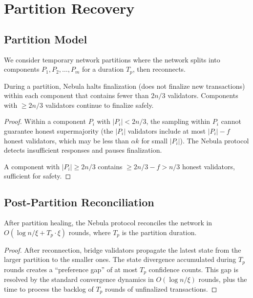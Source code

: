 \section{Partition Recovery}

\label{sec:nebula-partition}

\subsection{Partition Model}

We consider temporary network partitions where the network splits into components
$P_1, P_2, \ldots, P_m$ for a duration $T_p$, then reconnects.

\begin{proposition}
\label{prop:partition}
During a partition, Nebula halts finalization (does not finalize new transactions)
within each component that contains fewer than $2n/3$ validators. Components with
$\geq 2n/3$ validators continue to finalize safely.
\end{proposition}

\begin{proof}
Within a component $P_i$ with $|P_i| < 2n/3$, the sampling within $P_i$ cannot
guarantee honest supermajority (the $|P_i|$ validators include at most $|P_i| - f$
honest validators, which may be less than $\alpha k$ for small $|P_i|$). The Nebula
protocol detects insufficient responses and pauses finalization.

A component with $|P_i| \geq 2n/3$ contains $\geq 2n/3 - f > n/3$ honest validators,
sufficient for safety.
\end{proof}

\subsection{Post-Partition Reconciliation}

\begin{proposition}
\label{prop:reconciliation}
After partition healing, the Nebula protocol reconciles the network in $O(\log n / \xi + T_p \cdot \xi)$
rounds, where $T_p$ is the partition duration.
\end{proposition}

\begin{proof}
After reconnection, bridge validators propagate the latest state from the larger
partition to the smaller ones. The state divergence accumulated during $T_p$ rounds
creates a ``preference gap'' of at most $T_p$ confidence counts. This gap is resolved
by the standard convergence dynamics in $O(\log n / \xi)$ rounds, plus the time to
process the backlog of $T_p$ rounds of unfinalized transactions.
\end{proof}

